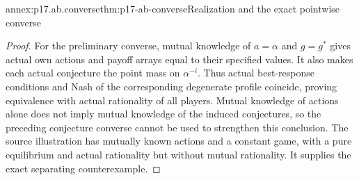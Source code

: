 \begin{annexitem}{annex:p17.ab.converse}{thm:p17-ab-converse}{Realization and the exact pointwise converse}
\begin{proof}
For the preliminary converse, mutual knowledge of \(a=\alpha\)
and \(g=g^*\) gives actual own actions and payoff arrays equal
to their specified values. It also makes each actual conjecture
the point mass on \(\alpha^{-i}\). Thus actual best-response
conditions and Nash of the corresponding degenerate profile
coincide, proving equivalence with actual rationality of all
players. Mutual knowledge of actions alone does not imply
mutual knowledge of the induced conjectures, so the preceding
conjecture converse cannot be used to strengthen this conclusion.
The source illustration has mutually known actions and a constant
game, with a pure equilibrium and actual rationality but without
mutual rationality. It supplies the exact separating counterexample.
\end{proof}
\end{annexitem}

